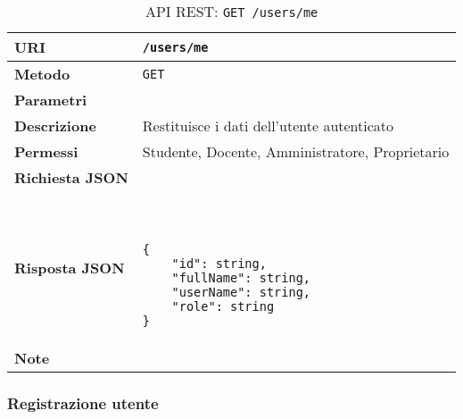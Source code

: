         \begin{table}[H]
            \begin{center}
                \begin{tabular}{p{} p{}}
                    \toprule
                    \textbf{URI} & \texttt{/users/me} \\ \midrule
                    \textbf{Metodo} & \texttt{GET} \\ \midrule
                    \textbf{Parametri} & \\ \midrule
                    \textbf{Descrizione} & Restituisce i dati dell'utente autenticato \\ \midrule
                    \textbf{Permessi} & Studente, Docente, Amministratore, Proprietario  \\ \midrule
                    \textbf{Richiesta JSON} & \\ \midrule
                    \textbf{Risposta JSON} & \
                        \begin{lstlisting}[basicstyle={\ttfamily}]
{
    "id": string,
    "fullName": string,
    "userName": string,
    "role": string
}
                        \end{lstlisting}
                        \\ \midrule
                    \textbf{Note} & \\
                    \bottomrule
                \end{tabular}
                \caption{API REST: \texttt{GET /users/me}}
            \end{center}
        \end{table}

    \subsubsection{Registrazione utente}

